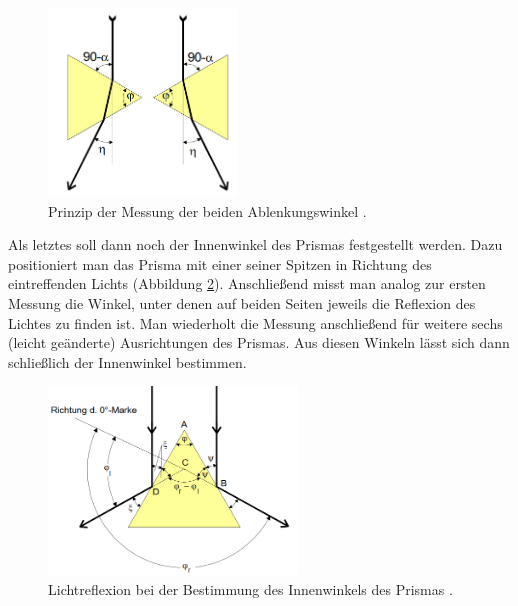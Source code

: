 \begin{figure}[H]
  \centering
  \includegraphics[height=5cm]{eta.PNG}
  \caption{Prinzip der Messung der beiden Ablenkungswinkel \cite{sample}.}
  \label{fig:eta}
\end{figure}

Als letztes soll dann noch der Innenwinkel des Prismas festgestellt werden. Dazu positioniert man das Prisma mit einer seiner Spitzen in
Richtung des eintreffenden Lichts (Abbildung \ref{fig:phi}). Anschließend misst man analog zur ersten Messung die Winkel, unter denen auf beiden Seiten jeweils
die Reflexion des Lichtes zu finden ist. Man wiederholt die Messung anschließend für weitere sechs (leicht geänderte) Ausrichtungen
des Prismas. Aus diesen Winkeln lässt sich dann schließlich der Innenwinkel bestimmen.

\begin{figure}[H]
  \centering
  \includegraphics[height=5cm]{phi.PNG}
  \caption{Lichtreflexion bei der Bestimmung des Innenwinkels des Prismas \cite{sample}.}
  \label{fig:phi}
\end{figure}
